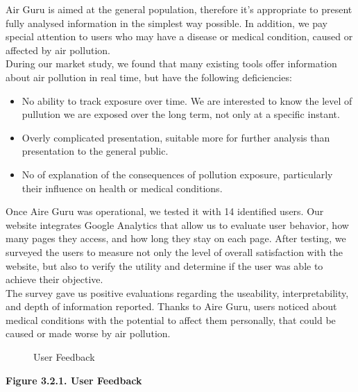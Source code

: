 Air Guru is aimed at the general population, therefore it's appropriate to present fully analysed information in the simplest way possible.
In addition, we pay special attention to users who may have a
disease or medical condition, caused or affected by air pollution.\\

During our market study, we found that many existing tools offer information about air pollution in real time, but have the following deficiencies:
\begin{itemize}
    \item No ability to track exposure over time. We are interested to know the level of pullution we are exposed over the long term, not only at a specific instant.
    \item Overly complicated presentation, suitable more for further analysis than presentation to the general public.
    \item No of explanation of the consequences of pollution exposure, particularly their influence on health or medical conditions.
\end{itemize}

Once Aire Guru was operational, we tested it with 14 identified users. Our website integrates Google Analytics that allow us to evaluate
user behavior, how many pages they access, and how long they stay on each page.
After testing, we surveyed the users to measure not only the level of overall satisfaction with the website,
but also to verify the utility and determine if the user was able to achieve their objective.\\

The survey gave us positive evaluations regarding the useability, interpretability, and depth of information reported. 
Thanks to Aire Guru, users noticed about medical conditions with the potential to affect them personally, that could be caused or made worse by air pollution.\\

\begin{figure}[ht]
    \centering
    \hfill
    \caption{User Feedback}
\end{figure}

\begin{center}
    \bf{Figure 3.2.1. User Feedback}
\end{center}